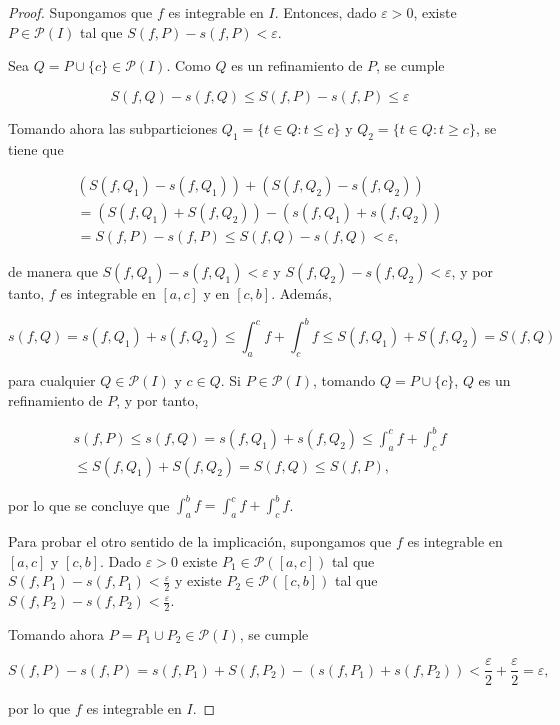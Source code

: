 \documentclass[
  a4paper,
]{scrreport}
\theoremstyle{plain}
\theoremstyle{definition}
\theoremstyle{plain}
\theoremstyle{plain}
\theoremstyle{definition}
\theoremstyle{definition}
\theoremstyle{remark}
\begin{document}
\begin{tcolorbox}[enhanced jigsaw, titlerule=0mm, arc=.35mm, colframe=quarto-callout-note-color-frame, bottomrule=.15mm, opacitybacktitle=0.6, rightrule=.15mm, coltitle=black, colback=white, toprule=.15mm, title=\textcolor{quarto-callout-note-color}{\faInfo}\hspace{0.5em}{Demostración}, leftrule=.75mm, bottomtitle=1mm, opacityback=0, breakable, colbacktitle=quarto-callout-note-color!10!white, toptitle=1mm, left=2mm]

\begin{proof}
Supongamos que \(f\) es integrable en \(I\). Entonces, dado
\(\varepsilon>0\), existe \(P\in\mathcal{P}(I)\) tal que
\(S(f,P)-s(f,P)<\varepsilon\).

Sea \(Q=P\cup\{c\}\in\mathcal{P}(I)\). Como \(Q\) es un refinamiento de
\(P\), se cumple

\[
S(f,Q)-s(f,Q) \leq S(f,P)-s(f,P) \leq \varepsilon
\]

Tomando ahora las subparticiones \(Q_1=\{t\in Q:t\leq c\}\) y
\(Q_2=\{t\in Q: t\geq c\}\), se tiene que

\[
\begin{gathered}
(S(f,Q_1)-s(f,Q_1)) + (S(f,Q_2)-s(f,Q_2)) \\
= (S(f,Q_1) + S(f,Q_2)) - (s(f,Q_1) + s(f,Q_2)) \\
= S(f,P) - s(f,P) \leq S(f,Q) - s(f,Q) < \varepsilon,
\end{gathered}
\]

de manera que \(S(f,Q_1)-s(f,Q_1)<\varepsilon\) y
\(S(f,Q_2)-s(f,Q_2)<\varepsilon\), y por tanto, \(f\) es integrable en
\([a,c]\) y en \([c,b]\). Además,

\[
s(f,Q) = s(f,Q_1) + s(f,Q_2) \leq \int_a^c f + \int_c^b f \leq S(f,Q_1) + S(f,Q_2) = S(f,Q)
\]

para cualquier \(Q\in\mathcal{P}(I)\) y \(c\in Q\). Si
\(P\in\mathcal{P}(I)\), tomando \(Q=P\cup \{c\}\), \(Q\) es un
refinamiento de \(P\), y por tanto,

\[
\begin{gathered}
s(f,P) \leq s(f,Q) = s(f,Q_1) + s(f,Q_2) \leq \int_a^c f + \int_c^b f \\
\leq S(f,Q_1) + S(f,Q_2) = S(f,Q) \leq S(f,P),
\end{gathered}
\]

por lo que se concluye que \(\int_a^b f = \int_a^c f + \int_c^b f\).

Para probar el otro sentido de la implicación, supongamos que \(f\) es
integrable en \([a,c]\) y \([c,b]\). Dado \(\varepsilon>0\) existe
\(P_1\in\mathcal{P}([a,c])\) tal que
\(S(f,P_1)-s(f,P_1)<\frac{\varepsilon}{2}\) y existe
\(P_2\in\mathcal{P}([c,b])\) tal que
\(S(f,P_2)-s(f,P_2)<\frac{\varepsilon}{2}\).

Tomando ahora \(P=P_1\cup P_2\in \mathcal{P}(I)\), se cumple

\[
S(f,P)-s(f,P) = s(f,P_1) + S(f,P_2) - (s(f,P_1) + s(f,P_2)) < \frac{\varepsilon}{2}+\frac{\varepsilon}{2} =\varepsilon,
\]

por lo que \(f\) es integrable en \(I\).
\end{proof}

\end{tcolorbox}
\end{document}
